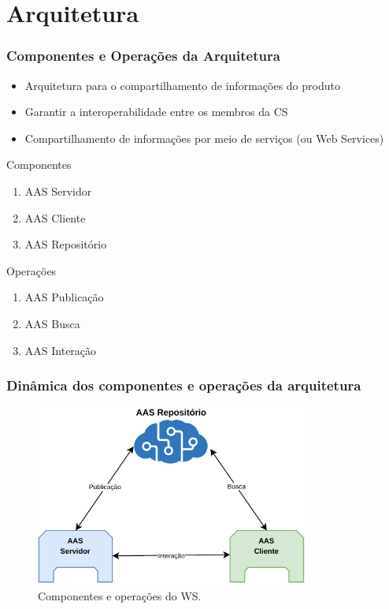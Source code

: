 \documentclass[10pt]{beamer}
\begin{document}
\section{Arquitetura}
\begin{frame}
	
	\frametitle{Componentes e Operações da Arquitetura}
	
	\begin{itemize}
		\item Arquitetura para o compartilhamento de informações do produto
		\item Garantir a interoperabilidade entre os membros da CS
		\item Compartilhamento de informações por meio de serviços (ou Web Services)
	\end{itemize}

	Componentes
	\begin{enumerate}
		\item AAS Servidor
		\item AAS Cliente
		\item AAS Repositório
	\end{enumerate}

	Operações
	\begin{enumerate}
		\item AAS Publicação
		\item AAS Busca
		\item AAS Interação
	\end{enumerate}
	
	
\end{frame}
\begin{frame}
	
	\frametitle{Dinâmica dos componentes e operações da arquitetura}
	
	\begin{figure}[htb]
		\centering
		\caption{Componentes e operações do WS.}
		\label{fig:aas-ws}
		\includegraphics[width=0.8\textwidth]{aas-ws}
	\end{figure}
	
\end{frame}
\end{document}
